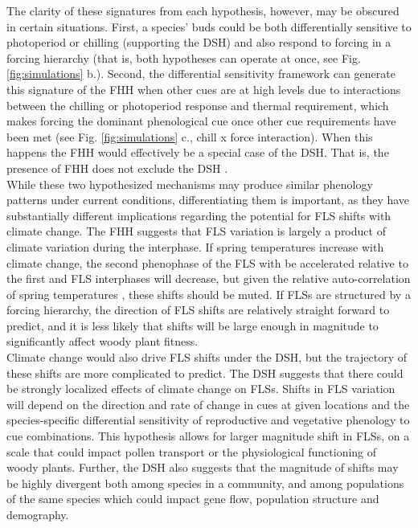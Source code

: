 \documentclass[11pt]{article}\usepackage[]{graphicx}\usepackage[]{color}
\begin{document}
\noindent The clarity of these signatures from each hypothesis, however, may be obscured in certain situations. First, a species' buds could be both differentially sensitive to photoperiod or chilling (supporting the DSH) and also respond to forcing in a forcing hierarchy (that is, both hypotheses can operate at once, see Fig. \ref{fig:simulations} b.). Second, the differential sensitivity framework can generate this signature of the FHH when other cues are at high levels due to interactions between the chilling or photoperiod response and thermal requirement, which makes forcing the dominant phenological cue once other cue requirements have been met (see Fig. \ref{fig:simulations} c., chill x force interaction). When this happens the FHH would effectively be a special case of the DSH. That is, the presence of FHH does not exclude the DSH \citep{Gariglio2006}.\\ %

\noident While these two hypothesized mechanisms may produce similar phenology patterns under current conditions, differentiating them %
is important, as they have substantially different implications regarding the potential for FLS shifts with climate change. The FHH suggests that FLS variation is largely a product of climate variation during the interphase. If spring temperatures increase with climate change, the second phenophase of the FLS with be accelerated relative to the first and FLS interphases will decrease, but given the relative auto-correlation of spring temperatures \citep{Di-Cecco:2018aa}, these shifts should be muted. If FLSs are structured by a forcing hierarchy, the direction of FLS shifts are relatively straight forward to predict, and it is less likely that shifts will be large enough in magnitude to significantly affect woody plant fitness.\\

\noindent Climate change would also drive FLS shifts under the DSH, but the trajectory of these shifts are more complicated to predict. The DSH suggests that there could be strongly localized effects of climate change on FLSs. Shifts in FLS variation will depend on the direction and rate of change in cues at given locations and the species-specific differential sensitivity of reproductive and vegetative phenology to cue combinations. This hypothesis allows for larger magnitude shift in FLSs, on a scale that could impact pollen transport or the physiological functioning of woody plants. Further, the DSH also suggests that the magnitude of shifts may be highly divergent both among species in a community, and among populations of the same species which could impact gene flow, population structure and demography.\\
\end{document}
